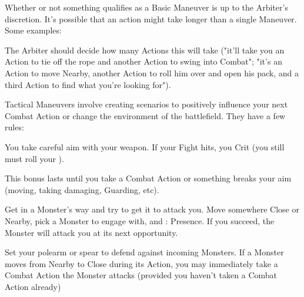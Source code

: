 {  Whether or not something qualifies as a Basic Maneuver is up to the Arbiter's discretion.  It's possible that an action might take longer than a single Maneuver.  Some examples:


  The Arbiter should decide how many Actions this will take ("it'll take you an Action to tie off the rope and another Action to swing into Combat"; "it's an Action to move Nearby, another Action to roll him over and open his pack, and a third Action to find what you're looking for").


  Tactical Maneuvers involve creating scenarios to positively influence your next Combat Action or change the environment of the battlefield.  They have a few rules:




  
  You take careful aim with your weapon.  If your  Fight \RO hits, you Crit (you still must roll your \FOC).

  This bonus lasts until you take a Combat Action or something breaks your aim (moving, taking damaging, Guarding, etc).

  Get in a Monster's way and try to get it to attack you.  Move somewhere Close or Nearby, pick a Monster to engage with, and \RS : Presence.  If you succeed, the Monster will attack you at its next opportunity.

  Set your polearm or spear to defend against incoming Monsters.  If a Monster moves from Nearby to Close during its Action, you may immediately take a Combat Action  the Monster attacks (provided you haven't taken a Combat Action already)

}
